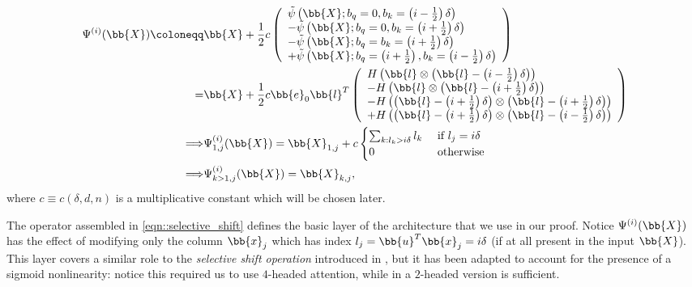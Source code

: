 \begin{equation}
\begin{split}
    \Psi^{(i)}(\bb{X})\coloneqq& \bb{X}
    + \frac{1}{2}c \left(\begin{array}{l}
    \tilde{\psi}\left(\bb{X};b_q=0,b_k=\left(i -\frac{1}{2}\right)\delta\right)\\
    - \tilde{\psi}\left(\bb{X};b_q=0,b_k=\left(i +\frac{1}{2}\right)\delta\right)\\
    - \tilde{\psi}\left(\bb{X};b_q=b_k=\left(i +\frac{1}{2}\right)\delta\right)\\
    + \tilde{\psi}\left(\bb{X};b_q=\left(i +\frac{1}{2}\right),b_k=\left(i -\frac{1}{2}\right)\delta\right)\\
    \end{array}\right)\\
    = & \bb{X}
    + \frac{1}{2}c \bb{e}_0\bb{l}^T\left(\begin{array}{l}
    H\left(\bb{l}\otimes\left(\bb{l}-\left(i -\frac{1}{2}\right)\delta\right)\right)\\
    - H\left(\bb{l}\otimes\left(\bb{l}-\left(i +\frac{1}{2}\right)\delta\right)\right)\\
    - H\left(\left(\bb{l}-\left(i +\frac{1}{2}\right)\delta\right)\otimes\left(\bb{l}-\left(i +\frac{1}{2}\right)\delta\right)\right)\\
    + H\left(\left(\bb{l}-\left(i +\frac{1}{2}\right)\delta\right)\otimes\left(\bb{l}-\left(i -\frac{1}{2}\right)\delta\right)\right)\\
    \end{array}\right)\\
    \Longrightarrow &\Psi^{(i)}_{1,j}(\bb{X})=\bb{X}_{1,j}+c\begin{cases}
        \sum_{k:l_k> i\delta} l_k &\text{ if }  l_j = i\delta \\
        0 &\text{ otherwise}
    \end{cases}\\
    \Longrightarrow &\Psi^{(i)}_{k>1,j}(\bb{X})=\bb{X}_{k,j},
    \end{split}
    \label{eqn::selective_shift}
\end{equation}
where $c\equiv c(\delta,d,n)$ is a multiplicative constant which will be chosen later. 

The operator assembled in \cref{eqn::selective_shift} defines the basic layer of the architecture that we use in our proof. Notice $\Psi^{(i)}(\bb{X})$ has the effect of modifying only the column $\bb{x}_j$ which has index $l_j=\bb{u}^T\bb{x}_j=i\delta$ (if at all present in the input $\bb{X}$). This layer covers a similar role to the \emph{selective shift operation} introduced in \citet[App.~B.5]{Yun_UAP}, but it has been adapted to account for the presence of a sigmoid nonlinearity: notice this required us to use $4$-headed attention, while in \cite{Yun_UAP} a $2$-headed version is sufficient.


